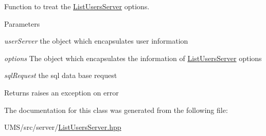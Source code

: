 Function to treat the \hyperlink{classListUsersServer}{ListUsersServer} options. 


\begin{DoxyParams}{Parameters}
\item[{\em userServer}]the object which encapsulates user information \item[{\em options}]The object which encapsulates the information of \hyperlink{classListUsersServer}{ListUsersServer} options \item[{\em sqlRequest}]the sql data base request \end{DoxyParams}
\begin{DoxyReturn}{Returns}
raises an exception on error 
\end{DoxyReturn}


The documentation for this class was generated from the following file:\begin{DoxyCompactItemize}
\item 
UMS/src/server/\hyperlink{ListUsersServer_8hpp}{ListUsersServer.hpp}\end{DoxyCompactItemize}
